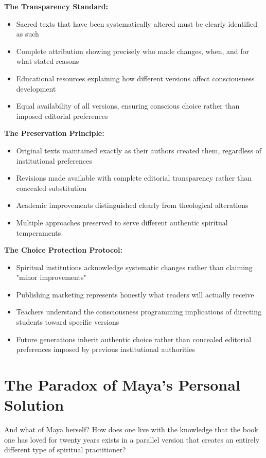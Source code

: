 \documentclass[11pt,twoside]{book}
\begin{document}
\textbf{\textbf{The Transparency Standard:}}
\begin{itemize}
\item Sacred texts that have been systematically altered must be clearly identified as such
\item Complete attribution showing precisely who made changes, when, and for what stated reasons
\item Educational resources explaining how different versions affect consciousness development
\item Equal availability of all versions, ensuring conscious choice rather than imposed editorial preferences
\end{itemize}

\textbf{\textbf{The Preservation Principle:}}
\begin{itemize}
\item Original texts maintained exactly as their authors created them, regardless of institutional preferences
\item Revisions made available with complete editorial transparency rather than concealed substitution
\item Academic improvements distinguished clearly from theological alterations
\item Multiple approaches preserved to serve different authentic spiritual temperaments
\end{itemize}

\textbf{\textbf{The Choice Protection Protocol:}}
\begin{itemize}
\item Spiritual institutions acknowledge systematic changes rather than claiming "minor improvements"
\item Publishing marketing represents honestly what readers will actually receive
\item Teachers understand the consciousness programming implications of directing students toward specific versions
\item Future generations inherit authentic choice rather than concealed editorial preferences imposed by previous institutional authorities
\end{itemize}
\section*{The Paradox of Maya's Personal Solution}
\label{sec:org947e63b}

And what of Maya herself? How does one live with the knowledge that the book one has loved for twenty years exists in a parallel version that creates an entirely different type of spiritual practitioner?
\end{document}
